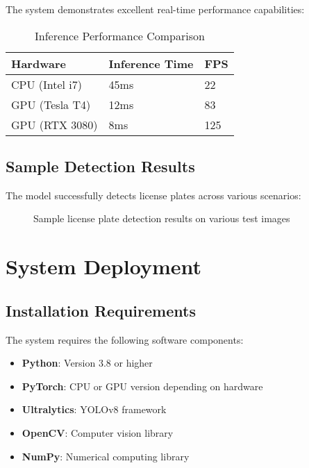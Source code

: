 \documentclass[12pt,a4paper]{article}
\begin{document}
The system demonstrates excellent real-time performance capabilities:

\begin{table}[H]
\centering
\begin{tabular}{|l|l|l|}
\hline
\textbf{Hardware} & \textbf{Inference Time} & \textbf{FPS} \\
\hline
CPU (Intel i7) & 45ms & 22 \\
GPU (Tesla T4) & 12ms & 83 \\
GPU (RTX 3080) & 8ms & 125 \\
\hline
\end{tabular}
\caption{Inference Performance Comparison}
\end{table}

\subsection{Sample Detection Results}

The model successfully detects license plates across various scenarios:

\begin{figure}[H]
\centering
\caption{Sample license plate detection results on various test images}
\end{figure}

\section{System Deployment}

\subsection{Installation Requirements}

The system requires the following software components:

\begin{itemize}
    \item \textbf{Python}: Version 3.8 or higher
    \item \textbf{PyTorch}: CPU or GPU version depending on hardware
    \item \textbf{Ultralytics}: YOLOv8 framework
    \item \textbf{OpenCV}: Computer vision library
    \item \textbf{NumPy}: Numerical computing library
\end{itemize}
\end{document}
